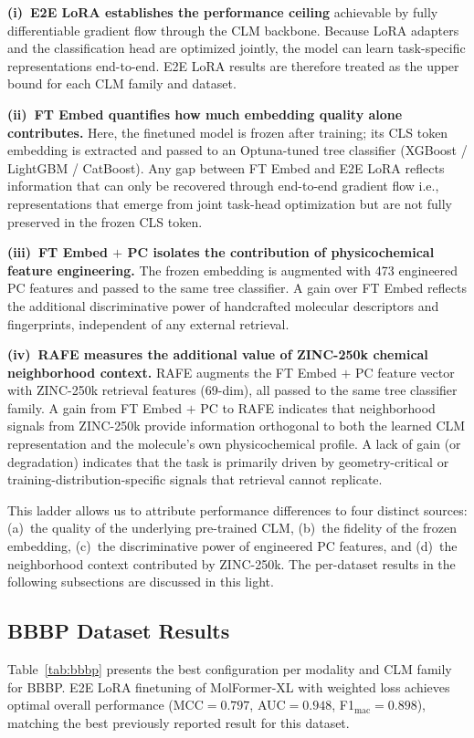\documentclass[pdflatex,sn-mathphys-num]{sn-jnl}%
\theoremstyle{thmstyleone}%
\theoremstyle{thmstyletwo}%
\theoremstyle{thmstylethree}%
\begin{document}
\textbf{(i)~E2E LoRA establishes the performance ceiling} achievable by fully differentiable gradient flow through the CLM backbone.  Because LoRA adapters and the classification head are optimized jointly, the model can learn task-specific representations end-to-end. E2E LoRA results are therefore treated as the upper bound for each CLM family and dataset.

\textbf{(ii)~FT Embed quantifies how much embedding quality alone contributes.} Here, the finetuned model is frozen after training; its CLS token embedding is extracted and passed to an Optuna-tuned tree classifier (XGBoost / LightGBM / CatBoost). Any gap between FT Embed and E2E LoRA reflects information that can only be recovered through
end-to-end gradient flow i.e., representations that emerge from joint task-head optimization but are not fully preserved in the frozen CLS token.

\textbf{(iii)~FT Embed $+$ PC isolates the contribution of physicochemical feature engineering.} The frozen embedding is augmented with 473 engineered PC features and passed to the same tree classifier. A gain over FT Embed reflects the additional discriminative power of handcrafted molecular descriptors and fingerprints, independent of any external retrieval.

\textbf{(iv)~RAFE measures the additional value of ZINC-250k chemical neighborhood context.} RAFE augments the FT Embed $+$ PC feature vector with ZINC-250k retrieval features (69-dim), all passed to the same tree classifier family. A gain from FT Embed $+$ PC to RAFE indicates that neighborhood signals from ZINC-250k provide information orthogonal to both the learned CLM representation and the molecule's own physicochemical profile. A lack of gain (or degradation) indicates that the task is primarily driven by geometry-critical or training-distribution-specific signals that retrieval cannot replicate.

This ladder allows us to attribute performance differences to four distinct sources: 
(a)~the quality of the underlying pre-trained CLM, (b)~the fidelity of the frozen embedding, (c)~the discriminative power of engineered PC features, and (d)~the neighborhood context contributed by ZINC-250k. The per-dataset results in the following subsections are discussed in this light.

\subsection{BBBP Dataset Results}
Table~\ref{tab:bbbp} presents the best configuration per modality and CLM family for BBBP. E2E LoRA finetuning of MolFormer-XL with weighted loss achieves optimal overall performance
(MCC$=0.797$, AUC$=0.948$, F1$_\text{mac}=0.898$), matching the best previously reported result for this dataset.
\end{document}
